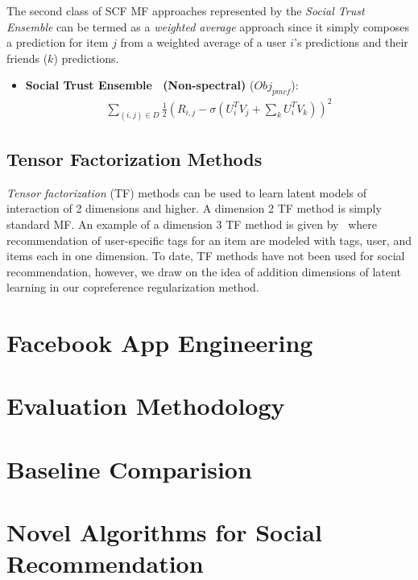 \documentclass{sig-alternate}
\newcommand{\Obj}{\mathit{Obj}}
\newcommand{\pmcf}{\mathit{pmcf}}
\begin{document}
The second class of SCF MF approaches represented by the {\it Social Trust Ensemble}
can be termed as a \emph{weighted average}
approach since it simply composes a prediction for item $j$ from a weighted average of a user $i$'s
predictions and their friends ($k$) predictions.

\begin{itemize}
\item {\bf Social Trust Ensemble~\cite{ste} (Non-spectral)} ($\Obj_\pmcf$):
\begin{align}
\sum_{(i,j) \in D} \frac{1}{2} (R_{i,j} - \sigma (U_i^T V_j + \sum_k U_i^T V_k))^2 \nonumber
\end{align}
\end{itemize}

\subsection{Tensor Factorization Methods}


\emph{Tensor factorization} (TF) methods can be used to learn latent
models of interaction of 2 dimensions and higher.  A dimension 2 TF
method is simply standard MF.  An example of a dimension 3 TF method
is given by~\cite{tf} where recommendation of user-specific tags for
an item are modeled with tags, user, and items each in one dimension.
To date, TF methods have not been used for social recommendation,
however, we draw on the idea of addition dimensions of latent learning
in our copreference regularization method.

\section{Facebook App Engineering}

\label{sec:FacebookApp}

\section{Evaluation Methodology}

\label{sec:Evaluation}

\section{Baseline Comparision}

\label{sec:Baselines}

\section{Novel Algorithms for Social Recommendation}
\end{document}
